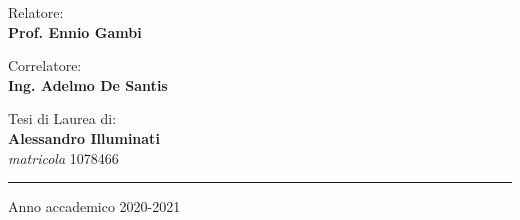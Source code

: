 \begin{titlepage}
    \noindent
    \begin{minipage}[t]{.49\textwidth}
        \flushleft

        {
            \large{Relatore:\\
                \vspace{1mm}
                \bf{Prof. Ennio Gambi}
            }\\

            \vspace{4.3mm}

            \large{Correlatore:\\
                \vspace{1mm}
                \bf{Ing. Adelmo De Santis}
            }

        }

    \end{minipage}
    \hspace{1mm}
    \noindent
    \begin{minipage}[t]{.49\textwidth}
        \vspace{6.5mm}
        \flushright
        {\large{ Tesi di Laurea di:\\
                \vspace{1mm}
                \bf{Alessandro Illuminati}
            }\\
        }
        \vspace{2mm}
        \small{\textit{matricola} 1078466}
    \end{minipage}


    \vfill
    \begin{center}
        \rule[0.1cm]{17cm}{0.1mm}
        {
            \large{
                Anno accademico 2020-2021
            }
        }
    \end{center}
\end{titlepage}
\restoregeometry
